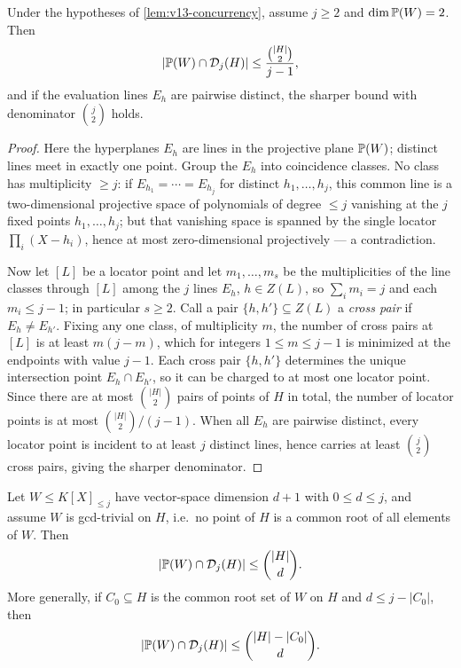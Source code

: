 \begin{theorem}\label{thm:v13-dim2}
Under the hypotheses of \cref{lem:v13-concurrency}, assume $j\ge2$ and $\dim\mathbb P(W)=2$.  Then
\[
        |\mathbb P(W)\cap\mathcal D_j(H)|
        \le
        \frac{\binom{|H|}{2}}{j-1},
\]
and if the evaluation lines $E_h$ are pairwise distinct, the sharper bound with denominator $\binom j2$ holds.
\end{theorem}

\begin{proof}
Here the hyperplanes $E_h$ are lines in the projective plane $\mathbb P(W)$; distinct lines meet in exactly one point.  Group the $E_h$ into coincidence classes.  No class has multiplicity $\ge j$: if $E_{h_1}=\cdots=E_{h_j}$ for distinct $h_1,\ldots,h_j$, this common line is a two-dimensional projective space of polynomials of degree $\le j$ vanishing at the $j$ fixed points $h_1,\ldots,h_j$; but that vanishing space is spanned by the single locator $\prod_i(X-h_i)$, hence at most zero-dimensional projectively --- a contradiction.

Now let $[L]$ be a locator point and let $m_1,\ldots,m_s$ be the multiplicities of the line classes through $[L]$ among the $j$ lines $E_h$, $h\in Z(L)$, so $\sum_i m_i=j$ and each $m_i\le j-1$; in particular $s\ge2$.  Call a pair $\{h,h'\}\subseteq Z(L)$ a \emph{cross pair} if $E_h\ne E_{h'}$.  Fixing any one class, of multiplicity $m$, the number of cross pairs at $[L]$ is at least $m(j-m)$, which for integers $1\le m\le j-1$ is minimized at the endpoints with value $j-1$.  Each cross pair $\{h,h'\}$ determines the unique intersection point $E_h\cap E_{h'}$, so it can be charged to at most one locator point.  Since there are at most $\binom{|H|}2$ pairs of points of $H$ in total, the number of locator points is at most $\binom{|H|}2/(j-1)$.  When all $E_h$ are pairwise distinct, every locator point is incident to at least $j$ distinct lines, hence carries at least $\binom j2$ cross pairs, giving the sharper denominator.
\end{proof}

\begin{theorem}\label{thm:v13-fixeddim}
Let $W\le K[X]_{\le j}$ have vector-space dimension $d+1$ with $0\le d\le j$, and assume $W$ is gcd-trivial on $H$, i.e.\ no point of $H$ is a common root of all elements of $W$.  Then
\[
        |\mathbb P(W)\cap\mathcal D_j(H)|\le \binom{|H|}{d}.
\]
More generally, if $C_0\subseteq H$ is the common root set of $W$ on $H$ and $d\le j-|C_0|$, then
\[
        |\mathbb P(W)\cap\mathcal D_j(H)|\le \binom{|H|-|C_0|}{d}.
\]
\end{theorem}

